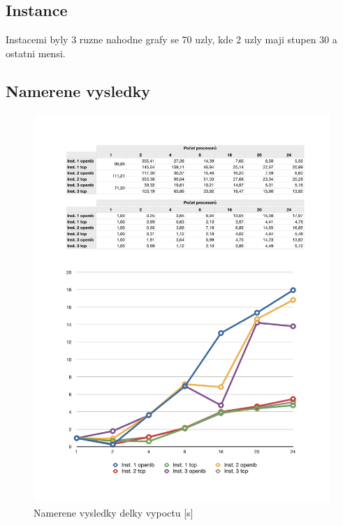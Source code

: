 \documentclass[a4paper]{article}
\begin{document}
\subsection{Instance}

Instacemi byly 3 ruzne nahodne grafy se 70 uzly, kde 2 uzly maji stupen 30 a ostatni mensi.

\subsection{Namerene vysledky}

\begin{figure}[ht]
\centerline{\includegraphics[width=\textwidth]{table-abs.pdf}}
\caption{Namerene vysledky delky vypoctu [s]}
\label{table-abs}
\end{figure}
\end{document}
